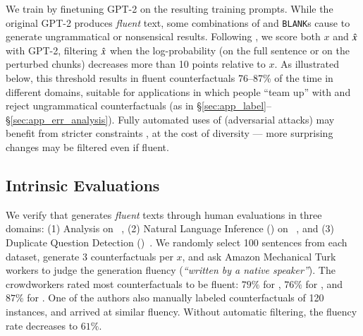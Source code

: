 We train \sysname by finetuning GPT-2 \cite{radford2019language} on the resulting training prompts.
While the original GPT-2 produces \emph{fluent} text,
some combinations of \tagstrs and \texttt{BLANK}s cause \sysname to generate ungrammatical or nonsensical results.
Following \citet{morris2020textattack}, we score both $x$ and $\hat{x}$ with GPT-2, filtering $\hat{x}$ when the log-probability (on the full sentence or on the perturbed chunks) decreases more than 10 points relative to $x$.
As illustrated below, this threshold results in fluent counterfactuals 76--87\% of the time in different domains, suitable for applications in which people ``team up'' with \sysname and reject ungrammatical counterfactuals (as in \S\ref{sec:app_label}--\S\ref{sec:app_err_analysis}). Fully automated uses of \sysname (\eg adversarial attacks) may benefit from stricter constraints \cite{morris2020textattack}, at the cost of diversity --- more surprising changes may be filtered even if fluent.


\subsection{Intrinsic Evaluations}
\label{subsec:intrinsic}



We verify that \sysname generates \emph{fluent} texts through human evaluations in three domains: (1) \sst Analysis on \dsst~\cite{socher2013recursive},
(2) Natural Language Inference (\nli) on \dnli~\cite{bowman-etal-2015-large}, and 
(3) Duplicate Question Detection (\dqqp)~\cite{wang2018glue}.
We randomly select 100 sentences from each dataset, generate 3 \sysname counterfactuals per $x$, and ask Amazon Mechanical Turk workers to judge the generation fluency (\emph{``written by a native speaker''}).
The crowdworkers rated most counterfactuals to be fluent: $79\%$ for \dsst, $76\%$ for \dqqp, and $87\%$ for \dnli.
One of the authors also manually labeled counterfactuals of 120 instances, and arrived at similar fluency.
Without automatic filtering, the fluency rate decreases to $61\%$.


